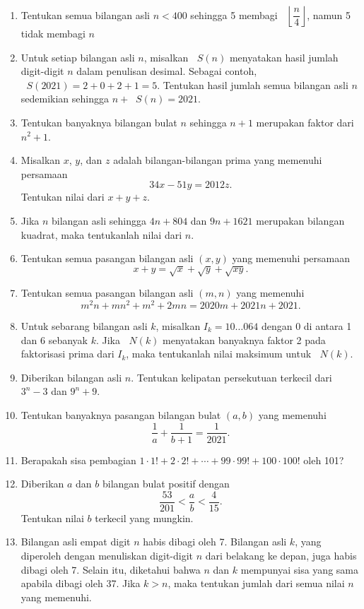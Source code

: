 \documentclass[12pt]{article}
\newcommand*\floor[1]{\mathop{}\!\left\lfloor{#1}\right\rfloor}
\newcommand*\func[2]{\mathop{}\!{#1}{\left({#2}\right)}}
\begin{document}
\begin{enumerate}[leftmargin=*]
		\item Tentukan semua bilangan asli $ n < 400 $ sehingga 5 membagi $ \floor{\dfrac{n}{4}} $, namun 5 tidak membagi $ n $
		\item Untuk setiap bilangan asli $ n $, misalkan $ \func{S}{n} $ menyatakan hasil jumlah digit-digit $ n $ dalam penulisan desimal. Sebagai contoh, $ \func{S}{2021} = 2 + 0 + 2 + 1 = 5 $. Tentukan hasil jumlah semua bilangan asli $ n $ sedemikian sehingga $ n + \func{S}{n} = 2021 $.
		\item Tentukan banyaknya bilangan bulat $ n $ sehingga $ n + 1 $ merupakan faktor dari $ n^{2} + 1 $.
		\item Misalkan $ x $, $ y $, dan $ z $ adalah bilangan-bilangan prima yang memenuhi persamaan
		\[ 34x - 51y = 2012z. \]
		Tentukan nilai dari $ x + y + z $.
		\item Jika $ n $ bilangan asli sehingga $ 4n + 804 $ dan $ 9n + 1621 $ merupakan bilangan kuadrat, maka tentukanlah nilai dari $ n $.
		\item Tentukan semua pasangan bilangan asli $ \left(x, y\right) $ yang memenuhi persamaan
		\[ x + y = \sqrt{x} + \sqrt{y} + \sqrt{xy}. \]
		\item Tentukan semua pasangan bilangan asli $ \left(m, n\right) $ yang memenuhi
		\[ m^{2}n + mn^{2} + m^{2} + 2mn = 2020m + 2021n + 2021. \]
		\item Untuk sebarang bilangan asli $ k $, misalkan $ I_{k} = 10 \dots 064 $ dengan 0 di antara 1 dan 6 sebanyak $ k $. Jika $ \func{N}{k} $ menyatakan banyaknya faktor 2 pada faktorisasi prima dari $ I_{k} $, maka tentukanlah nilai maksimum untuk $ \func{N}{k} $.
		\item Diberikan bilangan asli $ n $. Tentukan kelipatan persekutuan terkecil dari $ 3^{n} - 3 $ dan $ 9^{n} + 9 $.
		\item Tentukan banyaknya pasangan bilangan bulat $ \left(a, b\right) $ yang memenuhi
		\[ \frac{1}{a} + \frac{1}{b + 1} = \frac{1}{2021}. \]
		\item Berapakah sisa pembagian $ 1 \cdot 1! + 2 \cdot 2! + \cdots + 99 \cdot 99! + 100 \cdot 100! $ oleh 101?
		\item Diberikan $ a $ dan $ b $ bilangan bulat positif dengan
		\[ \frac{53}{201} < \frac{a}{b} < \frac{4}{15}. \]
		Tentukan nilai $ b $ terkecil yang mungkin.
		\item Bilangan asli empat digit $ n $ habis dibagi oleh 7. Bilangan asli $ k $, yang diperoleh dengan menuliskan digit-digit $ n $ dari belakang ke depan, juga habis dibagi oleh 7. Selain itu, diketahui bahwa $ n $ dan $ k $ mempunyai sisa yang sama apabila dibagi oleh 37. Jika $ k > n $, maka tentukan jumlah dari semua nilai $ n $ yang memenuhi.

\end{enumerate}
\end{document}
